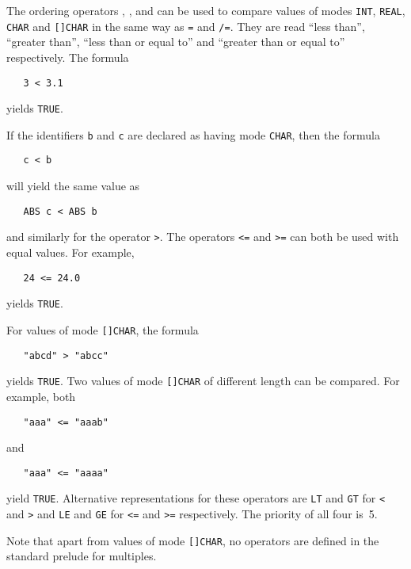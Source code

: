 The ordering operators \ixtt{<}, \ixtt{>}, \ixtt{<=} and \ixtt{>=}
can be used to compare values of modes \verb|INT|, \verb|REAL|,
\verb|CHAR| and \verb|[]CHAR| in the same way as \verb|=| and
\verb|/=|.  They are read ``less than'', ``greater than'', ``less
than or equal to'' and ``greater than or equal to'' respectively. The
formula
\begin{verbatim}
   3 < 3.1
\end{verbatim}
\noindent
yields \verb|TRUE|.

If the identifiers \verb|b| and \verb|c| are declared as having mode
\verb|CHAR|, then the formula
\begin{verbatim}
   c < b
\end{verbatim}
\noindent
will yield the same value as
\begin{verbatim}
   ABS c < ABS b
\end{verbatim}
\noindent
and similarly for the operator \verb|>|. The operators \verb|<=| and
\verb|>=| can both be used with equal values.  For example,
\begin{verbatim}
   24 <= 24.0
\end{verbatim}
\noindent
yields \verb|TRUE|.

For values of mode \verb|[]CHAR|, the formula
\begin{verbatim}
   "abcd" > "abcc"
\end{verbatim}
\noindent
yields \verb|TRUE|. Two values of mode \verb|[]CHAR| of different
length can be compared. For example, both
\begin{verbatim}
   "aaa" <= "aaab"
\end{verbatim}
\noindent
and
\begin{verbatim}
   "aaa" <= "aaaa"
\end{verbatim}
\noindent
yield \verb|TRUE|. Alternative representations for these operators
are \verb|LT| and \verb|GT| for \verb|<| and \verb|>| and \verb|LE|
and \verb|GE| for \verb|<=| and \verb|>=| respectively. The priority
of all four  is~5.

Note that apart from values of mode \verb|[]CHAR|, no operators are
defined in the standard prelude for multiples.

